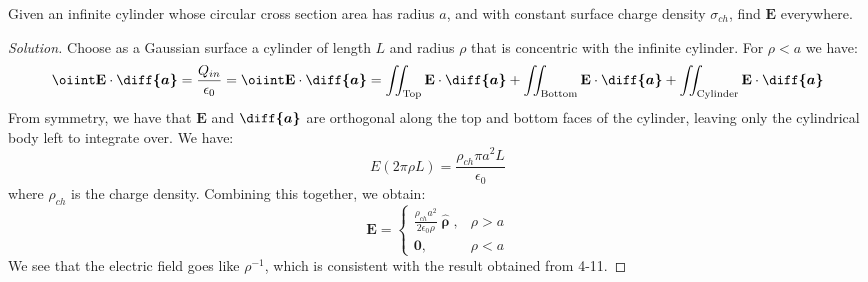 \documentclass[crop=false,class=book,oneside]{standalone}
\begin{document}
            \begin{problem}[Wangsness 4-7]
                Given an infinite cylinder whose circular
                cross section area has radius $a$, and with
                constant surface charge density $\sigma_{ch}$,
                find $\mathbf{E}$ everywhere.
            \end{problem}
            \begin{proof}[Solution]
                Choose as a Gaussian surface a cylinder of length
                $L$ and radius $\rho$ that is concentric with the
                infinite cylinder. For $\rho<a$ we have:
                \begin{equation*}
                    \oiint\mathbf{E}\cdot\boldsymbol{\diff{a}}
                    =\frac{Q_{in}}{\epsilon_{0}}
                    =\oiint\mathbf{E}\cdot\boldsymbol{\diff{a}}
                    =\iint_{\textrm{Top}}
                    \mathbf{E}\cdot\boldsymbol{\diff{a}}
                    +\iint_{\textrm{Bottom}}
                    \mathbf{E}\cdot\boldsymbol{\diff{a}}
                    +\iint_{\textrm{Cylinder}}
                    \mathbf{E}\cdot\boldsymbol{\diff{a}}
                \end{equation*}
                From symmetry, we have that $\mathbf{E}$ and
                $\boldsymbol{\diff{a}}$ are orthogonal along the
                top and bottom faces of the cylinder, leaving only
                the cylindrical body left to integrate over. We have:
                \begin{equation*}
                    E(2\pi\rho{L})
                    =\frac{\rho_{ch}\pi{a}^{2}L}{\epsilon_{0}}
                \end{equation*}
                where $\rho_{ch}$ is the charge density.
                Combining this together, we obtain:
                \begin{equation*}
                    \mathbf{E}=
                    \begin{cases}
                        \frac{\rho_{ch}a^{2}}{2\epsilon_{0}\rho}
                        \hat{\boldsymbol{\uprho}},
                        &\rho>a\\
                        \mathbf{0},&\rho<a
                    \end{cases}
                \end{equation*}
                We see that the electric field goes like $\rho^{-1}$,
                which is consistent with the result obtained from 4-11.
            \end{proof}
\end{document}
